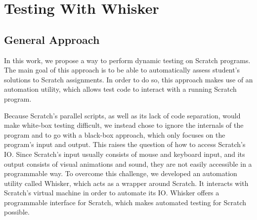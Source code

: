
\chapter{Testing With Whisker}


\section{General Approach}

In this work, we propose a way to perform dynamic testing on Scratch programs.
The main goal of this approach is to be able to automatically assess student's solutions to Scratch assignments.
In order to do so, this approach makes use of an automation utility, which allows test code to interact with a running Scratch program.
\parspace

Because Scratch's parallel scripts, as well as its lack of code separation, would make white-box testing difficult,
we instead chose to ignore the internals of the program and to go with a black-box approach, which only focuses on the program's input and output.
This raises the question of how to access Scratch's IO.
Since Scratch's input usually consists of mouse and keyboard input, and its output consists of visual animations and sound,
they are not easily accessible in a programmable way.
To overcome this challenge, we developed an automation utility called Whisker, which acts as a wrapper around Scratch.
It interacts with Scratch's virtual machine in order to automate its IO.
Whisker offers a programmable interface for Scratch, which makes automated testing for Scratch possible.
\parspace

